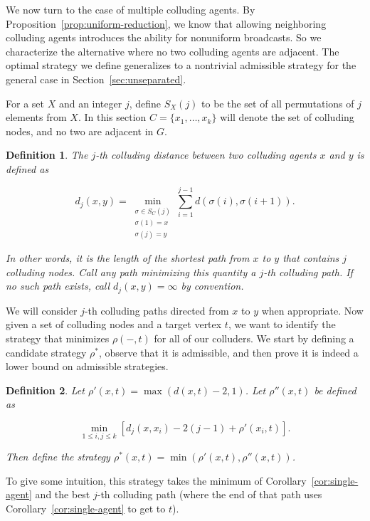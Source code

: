 \documentclass[reprint]{revtex4-1}
\newtheorem{definition}{Definition}[section]
\begin{document}
We now turn to the case of multiple colluding agents. By
Proposition~\ref{prop:uniform-reduction}, we know that allowing neighboring
colluding agents introduces the ability for nonuniform broadcasts. So we
characterize the alternative where no two colluding agents are adjacent. The
optimal strategy we define generalizes to a nontrivial admissible strategy for
the general case in Section~\ref{sec:unseparated}.

For a set $X$ and an integer $j$, define $S_X(j)$ to be the set of all
permutations of $j$ elements from $X$. In this section $C = \{ x_1, \dots, x_k
\}$ will denote the set of colluding nodes, and no two are adjacent in $G$.

\begin{definition}
The \emph{$j$-th colluding distance} between two colluding agents $x$ and $y$
is defined as

\[
   d_j(x, y)= \min_{\substack{\sigma \in S_C(j) \\ \sigma(1) = x \\ \sigma(j) =
y}}
         \sum_{i=1}^{j-1} d(\sigma(i),\sigma(i+1)).
\]

In other words, it is the length of the shortest path from $x$ to $y$ that
contains $j$ colluding nodes. Call any path minimizing this quantity a
\emph{$j$-th colluding path}. If no such path exists, call $d_j(x,y) = \infty$
by convention.  \end{definition}

We will consider $j$-th colluding paths directed from $x$ to $y$ when
appropriate. Now given a set of colluding nodes and a target vertex $t$, we
want to identify the strategy that minimizes $\rho(-,t)$ for all of our
colluders. We start by defining a candidate strategy $\rho^*$, observe that it
is admissible, and then prove it is indeed a lower bound on admissible
strategies.

\begin{definition} \label{def:colluding-distance}
Let $\rho'(x,t) = \max(d(x,t) - 2, 1)$. Let $\rho''(x, t)$ be defined as

\[
   \min_{1 \leq i,j \leq k} \left [ d_j(x,x_i)-2(j-1) + \rho'(x_i, t) \right ].
\]

Then define the strategy $\rho^*(x,t)=\min(\rho'(x,t), \rho''(x, t))$.

\end{definition}

To give some intuition, this strategy takes the minimum of
Corollary~\ref{cor:single-agent} and the best $j$-th colluding path (where the
end of that path uses Corollary~\ref{cor:single-agent} to get to $t$).
\end{document}
